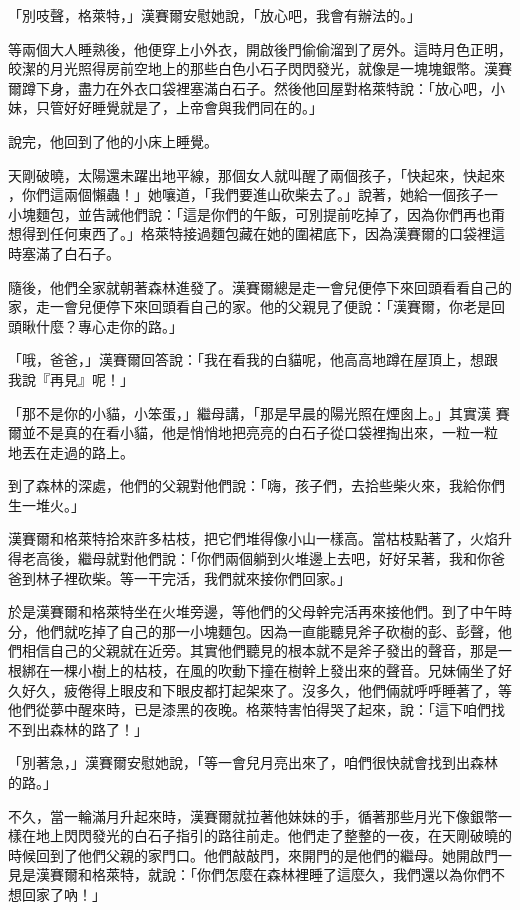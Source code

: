 \documentclass[oneside,11pt]{memoir} %
\begin{document}
「別吱聲，格萊特，」漢賽爾安慰她說，「放心吧，我會有辦法的。」

等兩個大人睡熟後，他便穿上小外衣，開啟後門偷偷溜到了房外。這時月色正明，
皎潔的月光照得房前空地上的那些白色小石子閃閃發光，就像是一塊塊銀幣。漢賽
爾蹲下身，盡力在外衣口袋裡塞滿白石子。然後他回屋對格萊特說：「放心吧，小
妹，只管好好睡覺就是了，上帝會與我們同在的。」

說完，他回到了他的小床上睡覺。

天剛破曉，太陽還未躍出地平線，那個女人就叫醒了兩個孩子，「快起來，快起來
，你們這兩個懶蟲！」她嚷道，「我們要進山砍柴去了。」說著，她給一個孩子一
小塊麵包，並告誡他們說：「這是你們的午飯，可別提前吃掉了，因為你們再也甭
想得到任何東西了。」格萊特接過麵包藏在她的圍裙底下，因為漢賽爾的口袋裡這
時塞滿了白石子。

隨後，他們全家就朝著森林進發了。漢賽爾總是走一會兒便停下來回頭看看自己的
家，走一會兒便停下來回頭看自己的家。他的父親見了便說：「漢賽爾，你老是回
頭瞅什麼？專心走你的路。」

「哦，爸爸，」漢賽爾回答說：「我在看我的白貓呢，他高高地蹲在屋頂上，想跟
我說『再見』呢！」

「那不是你的小貓，小笨蛋，」繼母講，「那是早晨的陽光照在煙囪上。」其實漢
賽爾並不是真的在看小貓，他是悄悄地把亮亮的白石子從口袋裡掏出來，一粒一粒
地丟在走過的路上。

到了森林的深處，他們的父親對他們說：「嗨，孩子們，去拾些柴火來，我給你們
生一堆火。」

漢賽爾和格萊特拾來許多枯枝，把它們堆得像小山一樣高。當枯枝點著了，火焰升
得老高後，繼母就對他們說：「你們兩個躺到火堆邊上去吧，好好呆著，我和你爸
爸到林子裡砍柴。等一干完活，我們就來接你們回家。」

於是漢賽爾和格萊特坐在火堆旁邊，等他們的父母幹完活再來接他們。到了中午時
分，他們就吃掉了自己的那一小塊麵包。因為一直能聽見斧子砍樹的彭、彭聲，他
們相信自己的父親就在近旁。其實他們聽見的根本就不是斧子發出的聲音，那是一
根綁在一棵小樹上的枯枝，在風的吹動下撞在樹幹上發出來的聲音。兄妹倆坐了好
久好久，疲倦得上眼皮和下眼皮都打起架來了。沒多久，他們倆就呼呼睡著了，等
他們從夢中醒來時，已是漆黑的夜晚。格萊特害怕得哭了起來，說：「這下咱們找
不到出森林的路了！」

「別著急，」漢賽爾安慰她說，「等一會兒月亮出來了，咱們很快就會找到出森林
的路。」

不久，當一輪滿月升起來時，漢賽爾就拉著他妹妹的手，循著那些月光下像銀幣一
樣在地上閃閃發光的白石子指引的路往前走。他們走了整整的一夜，在天剛破曉的
時候回到了他們父親的家門口。他們敲敲門，來開門的是他們的繼母。她開啟門一
見是漢賽爾和格萊特，就說：「你們怎麼在森林裡睡了這麼久，我們還以為你們不
想回家了吶！」
\end{document}

